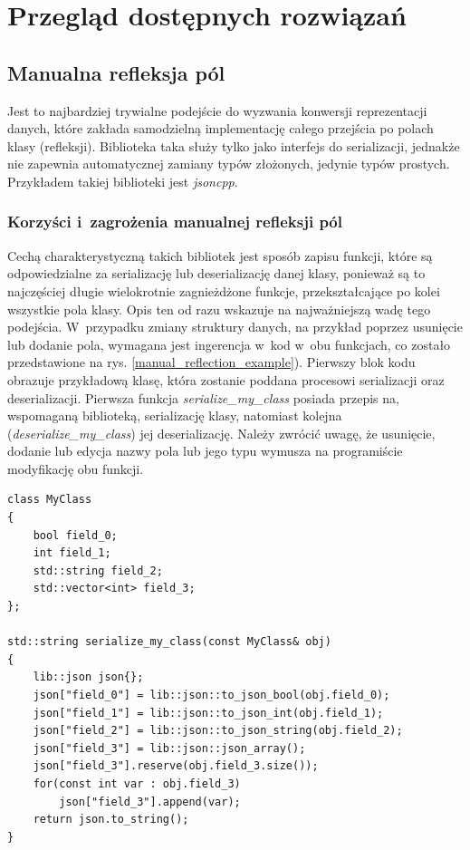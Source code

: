 \documentclass[12pt]{article}
\newcommand{\n}{\newline}
\newcommand{\nonpl}[1]{{\it #1}}
\newcommand{\code}[1]{{\it #1}}
\begin{document}
	{
		\section{Przegląd dostępnych rozwiązań} \label{possible_solutions}

		{
			\subsection{Manualna refleksja pól}

			Jest to najbardziej trywialne podejście do wyzwania konwersji reprezentacji danych, które zakłada samodzielną implementację całego przejścia
			po polach klasy (refleksji). Biblioteka taka służy tylko jako interfejs do serializacji, jednakże nie zapewnia automatycznej
			zamiany typów złożonych, jedynie typów prostych. Przykładem takiej biblioteki jest \nonpl{jsoncpp}\cite{jsoncpp_repo}.\n

			{
				\subsubsection{Korzyści i~zagrożenia manualnej refleksji pól}

				Cechą charakterystyczną takich bibliotek jest sposób zapisu funkcji, które są odpowiedzialne za serializację lub deserializację
				danej klasy, ponieważ są to najczęściej długie wielokrotnie zagnieżdżone funkcje, przekształcające po kolei wszystkie pola klasy.
				Opis ten od razu wskazuje na najważniejszą wadę tego podejścia. W~przypadku zmiany struktury danych, na przykład poprzez usunięcie
				lub dodanie pola, wymagana jest ingerencja w~kod w~obu funkcjach, co zostało przedstawione na rys. \ref{manual_reflection_example}).
				Pierwszy blok kodu obrazuje przykładową klasę, która zostanie poddana procesowi serializacji oraz deserializacji. Pierwsza funkcja
				\code{serialize\_my\_class} posiada przepis na, wspomaganą biblioteką, serializację klasy, natomiast kolejna (\code{deserialize\_my\_class})
				jej deserializację. Należy zwrócić uwagę, że usunięcie, dodanie lub edycja nazwy pola lub jego typu wymusza na programiście modyfikację
				obu funkcji.\n

				\begin{captioned}[H]
					\begin{lstlisting}[frame=single]
class MyClass
{
	bool field_0;
	int field_1;
	std::string field_2;
	std::vector<int> field_3;
};

std::string serialize_my_class(const MyClass& obj)
{
	lib::json json{};
	json["field_0"] = lib::json::to_json_bool(obj.field_0);
	json["field_1"] = lib::json::to_json_int(obj.field_1);
	json["field_2"] = lib::json::to_json_string(obj.field_2);
	json["field_3"] = lib::json::json_array();
	json["field_3"].reserve(obj.field_3.size());
	for(const int var : obj.field_3)
		json["field_3"].append(var);
	return json.to_string();
}


\end{lstlisting}
\end{captioned}}}}
\end{document}
